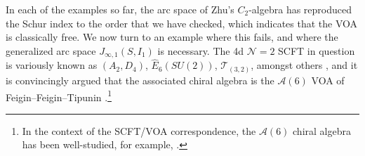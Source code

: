 \documentclass[12pt]{article}
\numberwithin{equation}{section}
\numberwithin{figure}{section}
\theoremstyle{plain}
\theoremstyle{definition}
\begin{document}
In each of the examples so far, the arc space of Zhu's $C_2$-algebra has reproduced the Schur index to the order that we have checked, which indicates that the VOA is classically free. We now turn to an example where this fails, and where the generalized arc space $J_{\infty,1}(S, I_1)$ is necessary. The 4d $\mathcal{N}=2$ SCFT in question is variously known as $(A_2, D_4)$, $\widehat{E}_6(SU(2))$, $\mathcal{T}_{(3,2)}$, amongst others \cite{Kang:2021lic,Buican:2016arp,Buican:2020moo,DelZotto:2015rca}, and it is convincingly argued \cite{Buican:2016arp} that the associated chiral algebra is the $\mathcal{A}(6)$ VOA of Feigin--Feigin--Tipunin \cite{Feigin:2007sp,MR2766985}.\footnote{In the context of the SCFT/VOA correspondence, the $\mathcal{A}(6)$ chiral algebra has been well-studied, for example, \cite{Buican:2016arp,Buican:2020moo,Kang:2021lic,Pan:2025gzh,Jiang:2024baj,Jiang:2026ffv}.}
\end{document}
